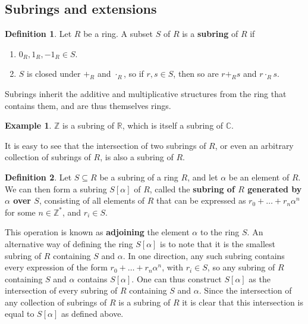 \documentclass{article}
\newcommand{\Z}{\mathbb{Z}}
\newcommand{\R}{\mathbb{R}}
\newcommand{\C}{\mathbb{C}}
\renewcommand{\sb}[1]{\left[ #1 \right]}
\theoremstyle{definition}\newtheorem{definition}{Definition}[section]
\theoremstyle{definition}\newtheorem{remark}[definition]{Remark}
\theoremstyle{definition}\newtheorem*{example}{Example}
\theoremstyle{definition}\newtheorem*{note}{Note}
\begin{document}
\subsection{Subrings and extensions}

\begin{definition}
Let $ R $ be a ring. A subset $ S $ of $ R $ is a \textbf{subring} of $ R $ if
\begin{enumerate}
\item $ 0_R, 1_R, -1_R \in S $.
\item $ S $ is closed under $ +_R $ and $ \cdot_R $, so if $ r, s \in S $, then so are $ r +_R s $ and $ r \cdot_R s $.
\end{enumerate}
\end{definition}

Subrings inherit the additive and multiplicative structures from the ring that contains them, and are thus themselves rings.

\begin{example}
$ \Z $ is a subring of $ \R $, which is itself a subring of $ \C $.
\end{example}

It is easy to see that the intersection of two subrings of $ R $, or even an arbitrary collection of subrings of $ R $, is also a subring of $ R $.

\begin{definition}
Let $ S \subseteq R $ be a subring of a ring $ R $, and let $ \alpha $ be an element of $ R $. We can then form a subring $ S\sb{\alpha} $ of $ R $, called the \textbf{subring of $ R $ generated by $ \alpha $ over $ S $}, consisting of all elements of $ R $ that can be expressed as $ r_0 + \dots + r_n\alpha^n $ for some $ n \in \Z^* $, and $ r_i \in S $.
\end{definition}

This operation is known as \textbf{adjoining} the element $ \alpha $ to the ring $ S $. An alternative way of defining the ring $ S\sb{\alpha} $ is to note that it is the smallest subring of $ R $ containing $ S $ and $ \alpha $. In one direction, any such subring contains every expression of the form $ r_0 + \dots + r_n\alpha^n $, with $ r_i \in S $, so any subring of $ R $ containing $ S $ and $ \alpha $ contains $ S\sb{\alpha} $. One can thus construct $ S\sb{\alpha} $ as the intersection of every subring of $ R $ containing $ S $ and $ \alpha $. Since the intersection of any collection of subrings of $ R $ is a subring of $ R $ it is clear that this intersection is equal to $ S\sb{\alpha} $ as defined above.
\end{document}

